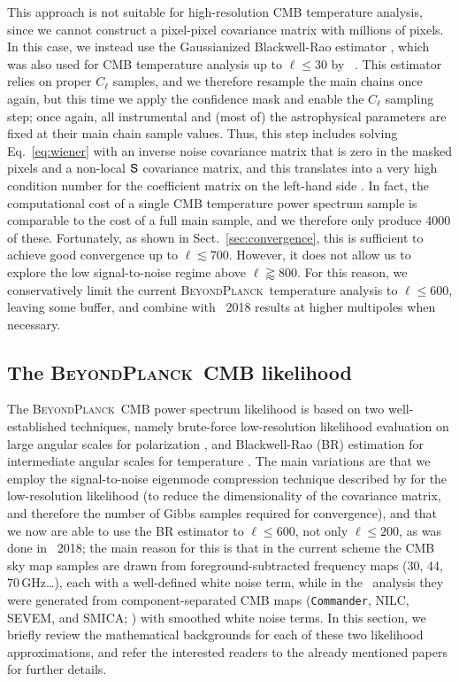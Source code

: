 \documentclass[twocolumn]{aa}
\def\commander{\texttt{Commander}}
\renewcommand{\S}[0]{\tens{S}}
\newcommand{\BP}{\textsc{BeyondPlanck}}
\begin{document}
This approach is not suitable for high-resolution CMB temperature
analysis, since we cannot construct a pixel-pixel covariance matrix
with millions of pixels. In this case, we instead use the Gaussianized
Blackwell-Rao estimator \citep{chu2005,rudjord:2009}, which was also
used for CMB temperature analysis up to $\ell\le30$ by
\Planck\ \citep[e.g.,][]{planck2016-l05}. This estimator relies on
proper $C_{\ell}$ samples, and we therefore resample the main chains
once again, but this time we apply the confidence mask and enable the
$C_{\ell}$ sampling step; once again, all instrumental and (most of)
the astrophysical parameters are fixed at their main chain sample
values. Thus, this step includes solving Eq.~\eqref{eq:wiener} with an
inverse noise covariance matrix that is zero in the masked pixels and
a non-local $\S$ covariance matrix, and this translates into a very
high condition number for the coefficient matrix on the left-hand side
\citep{seljebotn:2019}. In fact, the computational cost of a single
CMB temperature power spectrum sample is comparable to the cost of a
full main sample, and we therefore only produce 4000 of
these. Fortunately, as shown in Sect.~\ref{sec:convergence}, this is
sufficient to achieve good convergence up to $\ell\lesssim
700$. However, it does not allow us to explore the low signal-to-noise
regime above $\ell\gtrapprox 800$. For this reason, we conservatively limit the current
\BP\ temperature analysis to $\ell\le 600$, leaving some buffer, and
combine with \Planck\ 2018 results at higher multipoles when
necessary.


\subsection{The \BP\ CMB likelihood}
\label{subsec:cmb_like_bp}

The \BP\ CMB power spectrum likelihood is based on two
well-established techniques, namely brute-force low-resolution
likelihood evaluation on large angular scales for polarization
\citep[e.g.,][]{page2007,planck2016-l05}, and Blackwell-Rao (BR)
estimation for intermediate angular scales for temperature
\citep{chu2005,rudjord:2009,planck2014-a13}. The main variations are
that we employ the signal-to-noise eigenmode compression technique
described by \citet{tegmark1997,gjerlow2015} for the low-resolution
likelihood (to reduce the dimensionality of the covariance matrix, and
therefore the number of Gibbs samples required for convergence), and
that we now are able to use the BR estimator to $\ell\le 600$, not
only $\ell\le200$, as was done in \Planck\ 2018; the main reason for
this is that in the current scheme the CMB sky map samples are drawn
from foreground-subtracted frequency maps (30, 44, 70\,GHz\ldots),
each with a well-defined white noise term, while in the
\Planck\ analysis they were generated from component-separated CMB
maps (\commander, NILC, SEVEM, and SMICA; \citealp{planck2016-l04})
with smoothed white noise terms. In this section, we briefly review
the mathematical backgrounds for each of these two likelihood
approximations, and refer the interested readers to the already
mentioned papers for further details.
\end{document}
